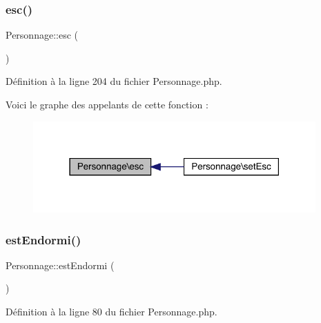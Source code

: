 \subsubsection{\texorpdfstring{esc()}{esc()}}
{\footnotesize\ttfamily Personnage\+::esc (\begin{DoxyParamCaption}{ }\end{DoxyParamCaption})}



Définition à la ligne 204 du fichier Personnage.\+php.

Voici le graphe des appelants de cette fonction \+:\nopagebreak
\begin{figure}[H]
\begin{center}
\leavevmode
\includegraphics[width=307pt]{class_personnage_aae5ecffa3c0802af6664ad0f3b396561_icgraph}
\end{center}
\end{figure}
\mbox{\label{class_personnage_aabf0bcd80fcea089de16f33c029aae12}} 
\subsubsection{\texorpdfstring{est\+Endormi()}{estEndormi()}}
{\footnotesize\ttfamily Personnage\+::est\+Endormi (\begin{DoxyParamCaption}{ }\end{DoxyParamCaption})}



Définition à la ligne 80 du fichier Personnage.\+php.

